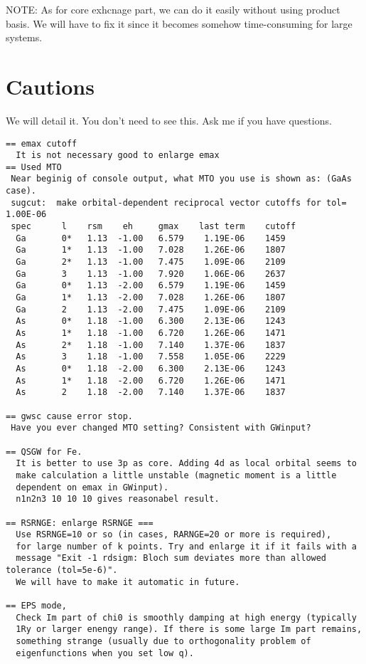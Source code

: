 \documentclass[a4paper,10pt,epsf,fleqn]{article}
\begin{document}
NOTE: As for core exhcnage part, we can do it easily without using product
basis. We will have to fix it since it becomes somehow time-consuming for large systems.


\section{Cautions}
We will detail it. You don't need to see this.
Ask me if you have questions.

\begin{verbatim}
== emax cutoff
  It is not necessary good to enlarge emax
== Used MTO 
 Near beginig of console output, what MTO you use is shown as: (GaAs case).
 sugcut:  make orbital-dependent reciprocal vector cutoffs for tol= 1.00E-06
 spec      l    rsm    eh     gmax    last term    cutoff
  Ga       0*   1.13  -1.00   6.579    1.19E-06    1459
  Ga       1*   1.13  -1.00   7.028    1.26E-06    1807
  Ga       2*   1.13  -1.00   7.475    1.09E-06    2109
  Ga       3    1.13  -1.00   7.920    1.06E-06    2637
  Ga       0*   1.13  -2.00   6.579    1.19E-06    1459
  Ga       1*   1.13  -2.00   7.028    1.26E-06    1807
  Ga       2    1.13  -2.00   7.475    1.09E-06    2109
  As       0*   1.18  -1.00   6.300    2.13E-06    1243
  As       1*   1.18  -1.00   6.720    1.26E-06    1471
  As       2*   1.18  -1.00   7.140    1.37E-06    1837
  As       3    1.18  -1.00   7.558    1.05E-06    2229
  As       0*   1.18  -2.00   6.300    2.13E-06    1243
  As       1*   1.18  -2.00   6.720    1.26E-06    1471
  As       2    1.18  -2.00   7.140    1.37E-06    1837

== gwsc cause error stop.
 Have you ever changed MTO setting? Consistent with GWinput?

== QSGW for Fe.
  It is better to use 3p as core. Adding 4d as local orbital seems to
  make calculation a little unstable (magnetic moment is a little
  dependent on emax in GWinput).
  n1n2n3 10 10 10 gives reasonabel result.

== RSRNGE: enlarge RSRNGE ===
  Use RSRNGE=10 or so (in cases, RARNGE=20 or more is required), 
  for large number of k points. Try and enlarge it if it fails with a
  message "Exit -1 rdsigm: Bloch sum deviates more than allowed tolerance (tol=5e-6)".
  We will have to make it automatic in future.

== EPS mode,
  Check Im part of chi0 is smoothly damping at high energy (typically
  1Ry or larger enengy range). If there is some large Im part remains,
  something strange (usually due to orthogonality problem of
  eigenfunctions when you set low q).


\end{verbatim}
\end{document}
